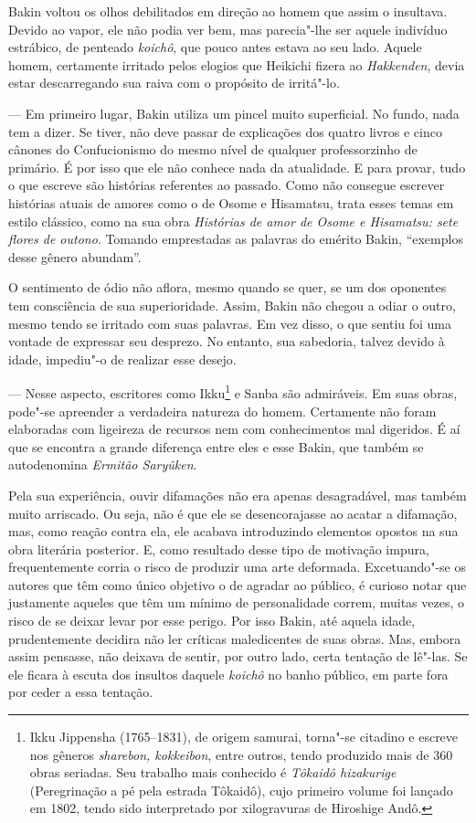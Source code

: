 Bakin voltou os olhos debilitados em direção ao homem que assim o
insultava. Devido ao vapor, ele não podia ver bem, mas parecia"-lhe ser
aquele indivíduo estrábico, de penteado \textit{koichô}, que pouco
antes estava ao seu lado. Aquele homem, certamente irritado pelos
elogios que Heikichi fizera ao \textit{Hakkenden}, devia estar
descarregando sua raiva com o propósito de irritá"-lo.

--- Em primeiro lugar, Bakin utiliza um pincel muito superficial. No
fundo, nada tem a dizer. Se tiver, não deve passar de explicações dos
quatro livros e cinco cânones do Confucionismo do mesmo nível de
qualquer professorzinho de primário. É por isso que ele não conhece
nada da atualidade. E para provar, tudo o que escreve são histórias
referentes ao passado. Como não consegue escrever histórias atuais de
amores como o de Osome e Hisamatsu, trata esses temas em estilo
clássico, como na sua obra \textit{Histórias de amor de Osome e
Hisamatsu: sete flores de outono}. Tomando emprestadas as palavras do
emérito Bakin, ``exemplos desse gênero abundam''.

O sentimento de ódio não aflora, mesmo quando se quer, se um dos
oponentes tem consciência de sua superioridade. Assim, Bakin não chegou
a odiar o outro, mesmo tendo se irritado com suas palavras. Em vez
disso, o que sentiu foi uma vontade de expressar seu desprezo. No
entanto, sua sabedoria, talvez devido à idade, impediu"-o de realizar
esse desejo.

--- Nesse aspecto, escritores como Ikku\footnote{ Ikku Jippensha 
(1765--1831), de origem samurai, torna"-se citadino e escreve nos
gêneros \textit{sharebon, kokkeibon}, entre outros, tendo produzido mais de
360 obras seriadas. Seu trabalho mais conhecido é \textit{Tôkaidô hizakurige} 
(Peregrinação a pé pela estrada Tôkaidô), cujo primeiro
volume foi lançado em 1802, tendo sido interpretado por xilogravuras de 
Hiroshige Andô.} e Sanba são admiráveis. Em suas obras, pode"-se
apreender a verdadeira natureza do homem. Certamente não foram
elaboradas com ligeireza de recursos nem com conhecimentos mal
digeridos. É aí que se encontra a grande diferença entre eles e esse
Bakin, que também se autodenomina \textit{Ermitão Saryûken}.

Pela sua experiência, ouvir difamações não era apenas desagradável, mas
também muito arriscado. Ou seja, não é que ele se desencorajasse ao
acatar a difamação, mas, como reação contra ela, ele acabava
introduzindo elementos opostos na sua obra literária posterior. E, como
resultado desse tipo de motivação impura, frequentemente corria o risco
de produzir uma arte deformada. Excetuando"-se os autores que têm como
único objetivo o de agradar ao público, é curioso notar que justamente
aqueles que têm um mínimo de personalidade correm, muitas vezes, o
risco de se deixar levar por esse perigo. Por isso Bakin, até aquela
idade, prudentemente decidira não ler críticas maledicentes de suas
obras. Mas, embora assim pensasse, não deixava de sentir, por outro
lado, certa tentação de lê"-las. Se ele ficara à escuta dos insultos
daquele \textit{koichô} no banho público, em parte fora por ceder a
essa tentação.

